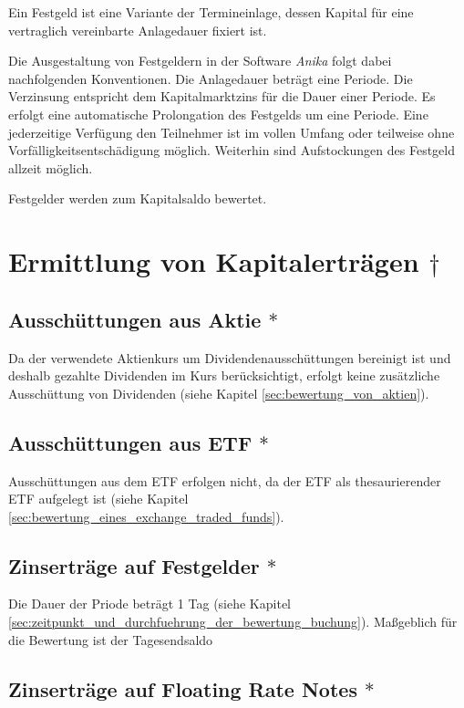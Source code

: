 \documentclass[12pt, a4paper]{article}
\begin{document}
Ein Festgeld ist eine Variante der Termineinlage, dessen Kapital für eine vertraglich vereinbarte Anlagedauer fixiert ist.

Die Ausgestaltung von Festgeldern in der Software \textit{Anika} folgt dabei nachfolgenden Konventionen. Die Anlagedauer beträgt eine Periode.
Die Verzinsung entspricht dem Kapitalmarktzins für die Dauer einer Periode. Es erfolgt eine automatische Prolongation des Festgelds um eine Periode. Eine jederzeitige Verfügung den Teilnehmer ist im vollen Umfang oder teilweise ohne Vorfälligkeitsentschädigung möglich.
Weiterhin sind Aufstockungen des Festgeld allzeit möglich.

Festgelder werden zum Kapitalsaldo bewertet. 

\section{Ermittlung von Kapitalerträgen $\dagger$}
\label{sec:ermittlung_von_wertpapierertraegen}

\subsection{Ausschüttungen aus Aktie $\ast$}
\label{sec:ausschuettung_aus_aktie}
Da der verwendete Aktienkurs um Dividendenausschüttungen bereinigt ist und deshalb gezahlte Dividenden im Kurs berücksichtigt, erfolgt keine zusätzliche Ausschüttung von Dividenden (siehe Kapitel \ref{sec:bewertung_von_aktien}).

\subsection{Ausschüttungen aus ETF $\ast$}
\label{sec:ausschuettungen_aus_etf}
Ausschüttungen aus dem ETF erfolgen nicht, da der {ETF} als thesaurierender {ETF} aufgelegt ist (siehe Kapitel \ref{sec:bewertung_eines_exchange_traded_funds}).

\subsection{Zinserträge auf Festgelder $\ast$}
\label{sec:zinsertraege_auf_festgelder}
Die Dauer der Priode beträgt 1 Tag (siehe Kapitel \ref{sec:zeitpunkt_und_durchfuehrung_der_bewertung_buchung}).
Maßgeblich für die Bewertung ist der Tagesendsaldo 


\subsection{Zinserträge auf Floating Rate Notes $\ast$}
\label{sec:zinsertraege_auf_floating_rate_notes}

\printbibliography[title={Literatur}]
\end{document}

